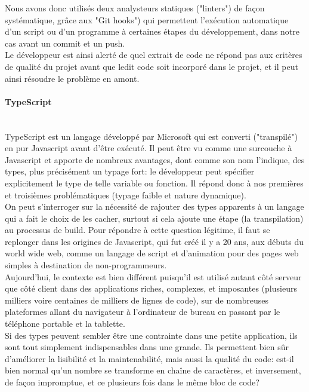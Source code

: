 \documentclass[a4paper,french,12pt]{article}
\begin{document}
		Nous avons donc utilisés deux analysteurs statiques ("linters") de façon systématique, grâce aux "Git hooks") qui permettent l'exécution automatique d'un script ou d'un programme à certaines étapes du développement, dans notre cas avant un commit et un push.~\\	
		
		Le développeur est ainsi alerté de quel extrait de code ne répond pas aux critères de qualité du projet avant que ledit code soit incorporé dans le projet, et il peut ainsi résoudre le problème en amont.
		
	\paragraph{TypeScript}~\\	
	
	TypeScript est un langage développé par Microsoft qui est converti ("transpilé") en pur Javascript avant d'être exécuté. Il peut être vu comme une surcouche à Javascript et apporte de nombreux avantages, dont comme son nom l'indique, des types, plus précisément un typage fort: le développeur peut spécifier explicitement le type de telle variable ou fonction. Il répond donc à nos premières et troisièmes problématiques (typage faible et nature dynamique).~\\
	
On peut s'interroger sur la nécessité de rajouter des types apparents à un langage qui a fait le choix de les cacher, surtout si cela ajoute une étape (la transpilation) au processus de build. Pour répondre à cette question légitime, il faut se replonger dans les origines de Javascript, qui fut créé il y a 20 ans, aux débuts du world wide web, comme un langage de script et d'animation pour des pages web simples à destination de non-programmeurs.~\\

	Aujourd'hui, le contexte est bien différent puisqu'il est utilisé autant côté serveur que côté client dans des applications riches, complexes, et imposantes (plusieurs milliers voire centaines de milliers de lignes de code), sur de nombreuses plateformes allant du navigateur à l'ordinateur de bureau en passant par le téléphone portable et la tablette.~\\
	
	Si des types peuvent sembler être une contrainte dans une petite application, ils sont tout simplement indispensables dans une grande.
	Ils permettent bien sûr d'améliorer la lisibilité et la maintenabilité, 
	mais aussi la qualité du code: est-il bien normal qu'un nombre se transforme en chaîne de caractères, et inversement, de façon impromptue, et ce plusieurs fois dans le même bloc de code? ~\\
	
\end{document}
